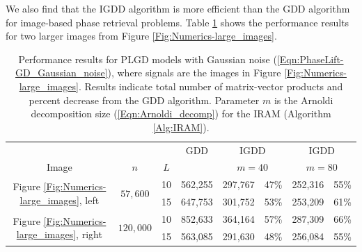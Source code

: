 We also find that the IGDD algorithm is more efficient than the GDD algorithm for image-based phase retrieval problems.
Table \ref{Tab:Numerics-ada_vs_orig_large_images} shows the performance results for two larger images from Figure \ref{Fig:Numerics-large_images}.



\begin{table}[H]
\centering
\begin{tabular}{ |ccc|c|cc|cc| }
 \hline
			&&&  GDD
			&  \multicolumn{2}{c|}{IGDD}
			&	\multicolumn{2}{c|}{IGDD}	\\
Image & $n$ & $L$ &  	& \multicolumn{2}{c|}{$m=40$}  & \multicolumn{2}{c|}{$m=80$}   \\
 \hline
	\multirow{2}{*}{Figure \ref{Fig:Numerics-large_images}, left} &
   \multirow{2}{*}{$57,600$} &  10 &  562,255  &  297,767 & 47\% &  252,316 & 55\% \\ 
  &&  15 &  647,753  &  301,752 & 53\% &  253,209 & 61\% \\ 
	\multirow{2}{*}{Figure \ref{Fig:Numerics-large_images}, right}  &   
     \multirow{2}{*}{$120,000$} &  10 &  852,633  &  364,164 & 57\% &  287,309 & 66\% \\ 
  &&  15 &  563,085  &  291,630 & 48\% &  256,084 & 55\% \\ 
 \hline
\end{tabular}
\vspace{0.5cm}
\caption{
Performance results for PLGD models with Gaussian noise (\ref{Eqn:PhaseLift-GD_Gaussian_noise}), where signals are the images in Figure \ref{Fig:Numerics-large_images}.
Results indicate total number of matrix-vector products and percent decrease from the GDD algorithm.
Parameter $m$ is the Arnoldi decomposition size (\ref{Eqn:Arnoldi_decomp}) for the IRAM (Algorithm \ref{Alg:IRAM}).
	} 
	\label{Tab:Numerics-ada_vs_orig_large_images}
\end{table}




